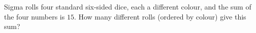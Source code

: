 Sigma rolls four standard six-sided dice, each a different colour, and the sum of the four numbers is $15$. How many different rolls (ordered by colour) give this sum?
